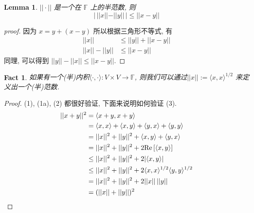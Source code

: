 \documentclass{article}
\newtheorem{fact}{Fact}
\newtheorem{lemma}{Lemma}
\def\<{\langle}
\def\>{\rangle}
\begin{document}
\begin{lemma}
  $||\cdot||$ 是一个在 $\mathbb{F}$ 上的半范数, 则 
  \[|\,||x|| - ||y||\,| \leq ||x - y||\]
\end{lemma}
\begin{proof}[proof]
  因为 $x = y + (x  - y)$ 所以根据三角形不等式, 有
  \begin{align*}
    ||x|| &\leq ||y|| + ||x - y|| \\
    ||x|| - ||y|| &\leq ||x - y||
  \end{align*}
  同理, 可以得到 $||y|| - ||x|| \leq ||x - y||$.
\end{proof}

\begin{fact}
  如果有一个(半)内积$\<\cdot, \cdot\>: V\times V\to\mathbb{F}$, 则我们可以通过$||x||:= \<x,x\>^{1/2}$ 来定义出一个(半)范数.
\end{fact}
\begin{proof}
  (1), (1a), (2) 都很好验证, 下面来说明如何验证 (3).
  \begin{align*}
    ||x + y||^2 &= \<x + y, x + y\> \\
                &= \<x, x\> + \<x, y\> + \<y, x\> + \<y, y\> \\
                &= ||x||^2 + ||y||^2 + \<x, y\> + \<y, x\> \\
                &= ||x||^2 + ||y||^2 + 2\mathrm{Re}\left[\<x, y\>\right] \\
                &\leq ||x||^2 + ||y||^2 + 2|\<x, y\>| \\
                &\leq ||x||^2 + ||y||^2 + 2\<x,x\>^{1/2}\<y,y\>^{1/2} \\
                &= ||x||^2 + ||y||^2 + 2||x||\,||y|| \\
                &= (||x|| + ||y||)^2 \qedhere
  \end{align*}
\end{proof}
\end{document}
